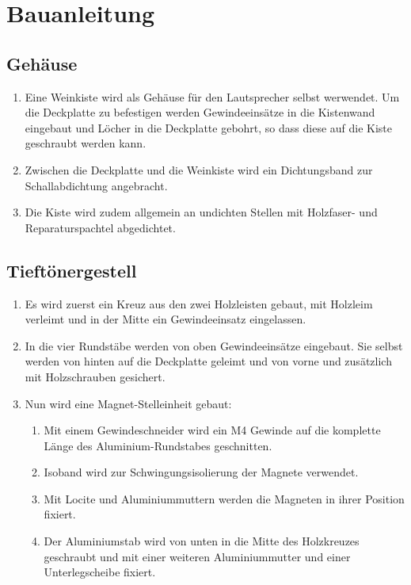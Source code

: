 \documentclass[a4paper,11pt]{report}
\begin{document}
\section{Bauanleitung}
\subsection{Gehäuse}
\begin{enumerate}
    \item Eine Weinkiste wird als Gehäuse für den Lautsprecher selbst werwendet. Um die Deckplatte zu befestigen werden Gewindeeinsätze in die Kistenwand eingebaut und Löcher in die Deckplatte gebohrt, so dass diese auf die Kiste geschraubt werden kann.
    \item Zwischen die Deckplatte und die Weinkiste wird ein Dichtungsband zur Schallabdichtung angebracht.
    \item Die Kiste wird zudem allgemein an undichten Stellen mit Holzfaser- und Reparaturspachtel abgedichtet. 
\end{enumerate}
\subsection{Tieftönergestell}
\begin{enumerate}
    \item Es wird zuerst ein Kreuz aus den zwei Holzleisten gebaut, mit Holzleim verleimt und in der Mitte ein Gewindeeinsatz eingelassen.
    \item In die vier Rundstäbe werden von oben Gewindeeinsätze eingebaut. Sie selbst werden von hinten auf die Deckplatte geleimt und von vorne und zusätzlich mit Holzschrauben gesichert.
    \item Nun wird eine Magnet-Stelleinheit gebaut:
    \begin{enumerate}
        \item Mit einem Gewindeschneider wird ein M4 Gewinde auf die komplette Länge des Aluminium-Rundstabes geschnitten.
        \item Isoband wird zur Schwingungsisolierung der Magnete verwendet.
        \item Mit Locite und Aluminiummuttern werden die Magneten in ihrer Position fixiert.
        \item Der Aluminiumstab wird von unten in die Mitte des Holzkreuzes geschraubt und mit einer weiteren Aluminiummutter und einer Unterlegscheibe fixiert.
    \end{enumerate}
\end{enumerate}
\end{document}
